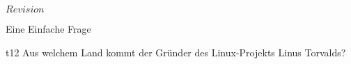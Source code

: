 \RCS $Revision$
\begin{aufgabe}[Technologie]{Eine Einfache Frage}
  \begin{teilaufgabe}[ohnenummer]{t}{1}{2}
      Aus welchem Land kommt der Gründer des Linux-Projekts Linus Torvalds?
  \end{teilaufgabe}
  \begin{loesung}
  \end{loesung}
\end{aufgabe}

